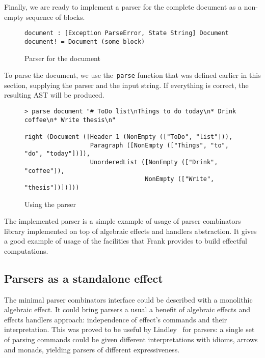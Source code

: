       Finally, we are ready to implement a parser for the complete document as a
      non-empty sequence of blocks.

      \begin{figure}[h]
      \begin{lstlisting}
document : [Exception ParseError, State String] Document
document! = Document (some block)
      \end{lstlisting}
      \caption{Parser for the document}
      \label{listing:parserMdDocCombo}
      \end{figure}

      To parse the document, we use the~\texttt{parse} function that was defined earlier
      in this section, supplying the parser and the input string. If everything is
      correct, the resulting AST will be produced.


      \begin{figure}[h]
      \begin{lstlisting}
> parse document "# ToDo list\nThings to do today\n* Drink coffee\n* Write thesis\n"

right (Document ([Header 1 (NonEmpty (["ToDo", "list"])),
                  Paragraph ([NonEmpty (["Things", "to", "do", "today"])]),
                  UnorderedList ([NonEmpty (["Drink", "coffee"]),
                                 NonEmpty (["Write", "thesis"])])]))
      \end{lstlisting}
      \caption{Using the parser}
      \label{listing:parserExprMainCombo}
      \end{figure}

      The implemented parser is a simple example of usage of parser combinators library
      implemented on top of algebraic effects and handlers abstraction. It gives a
      good example of usage of the facilities that Frank provides to build
      effectful computations.

  \subsection{Parsers as a standalone effect}

    The minimal parser combinators interface could be described with a monolithic
    algebraic effect. It could bring parsers a usual a benefit of algebraic effects
    and effects handlers approach: independence of effect's commands and their interpretation.
    This was proved to be useful by Lindley~\cite{Lindley:2014:AEE:2633628.2633636}
    for parsers: a single set of parsing commands could be given different interpretations
    with idioms, arrows and monads, yielding parsers of different expressiveness.

